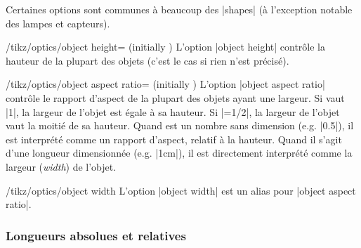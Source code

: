 \documentclass[a4paper]{ltxdoc}
\begin{document}
Certaines options sont communes à beaucoup des |shapes| (à l'exception notable des lampes et capteurs).

\begin{key}{/tikz/optics/object height= (initially )}
    L'option |object height| contrôle la hauteur de la plupart des objets (c'est le cas si rien n'est précisé).

\begin{codeexample}[width=5cm]
\end{codeexample}
\end{key}

\begin{key}{/tikz/optics/object aspect ratio= (initially )}
    L'option |object aspect ratio| contrôle le rapport d'aspect de la plupart des objets ayant une largeur. Si  vaut |1|, la largeur de l'objet est égale à sa hauteur.
    Si |=1/2|, la largeur de l'objet vaut la moitié de sa hauteur. 
    Quand  est un nombre sans dimension (e.g. |0.5|), il est interprété comme un rapport d'aspect, relatif à la hauteur. Quand il s'agit d'une longueur dimensionnée (e.g. |1cm|), il est directement interprété comme la largeur (\emph{width}) de l'objet.

\begin{codeexample}[width=5cm]
\end{codeexample}
\end{key}

\begin{stylekey}{/tikz/optics/object width}
    L'option |object width| est un alias pour |object aspect ratio|.
\end{stylekey}

\subsubsection{Longueurs absolues et relatives}
\end{document}
